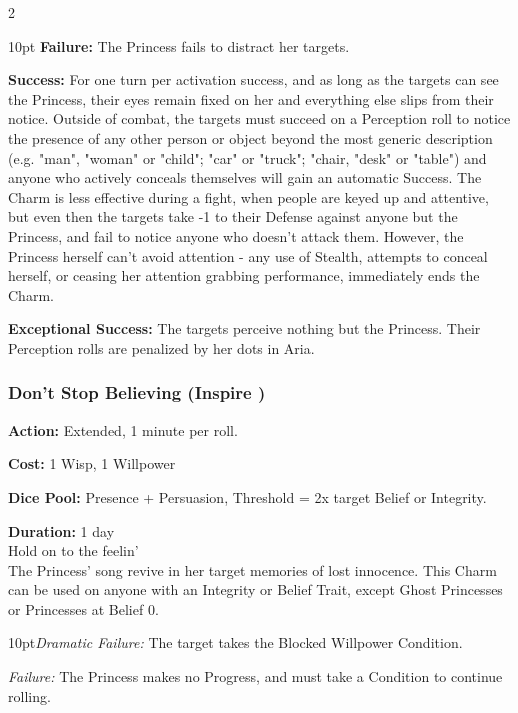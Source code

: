 \begin{multicols}{2}
\begin{myindentpar}{10pt}
\textbf{Failure:} The Princess fails to distract her targets.

\textbf{Success:} For one turn per activation success, and as long as the targets can see the Princess, their eyes remain fixed on her and everything else slips from their notice. Outside of combat, the targets must succeed on a Perception roll to notice the presence of any other person or object beyond the most generic description (e.g. "man", "woman" or "child"; "car" or "truck"; "chair, "desk" or "table") and anyone who actively conceals themselves will gain an automatic Success. The Charm is less effective during a fight, when people are keyed up and attentive, but even then the targets take -1 to their Defense against anyone but the Princess, and fail to notice anyone who doesn't attack them. However, the Princess herself can't avoid attention - any use of Stealth, attempts to conceal herself, or ceasing her attention grabbing performance, immediately ends the Charm.

\textbf{Exceptional Success:} The targets perceive nothing but the Princess. Their Perception rolls are penalized by her dots in Aria.\end{myindentpar}


\subsubsection*{Don't Stop Believing (Inspire \textbullet\textbullet\textbullet\textbullet)}

\noindent \textbf{Action:} Extended, 1 minute per roll. 

\noindent \textbf{Cost:} 1 Wisp, 1 Willpower

\noindent \textbf{Dice Pool:} Presence + Persuasion, Threshold = 2x target Belief or Integrity.

\noindent \textbf{Duration:} 1 day \\

\noindent Hold on to the feelin' \\

\noindent The Princess’ song revive in her target memories of lost innocence. This Charm can be used on anyone with an Integrity or Belief Trait, except Ghost Princesses or Princesses at Belief 0. 

\begin{myindentpar}{10pt}\emph{Dramatic Failure:} The target takes the Blocked Willpower Condition.

    \emph{Failure:} The Princess makes no Progress, and must take a Condition to continue rolling. 


\end{myindentpar}
\end{multicols}
